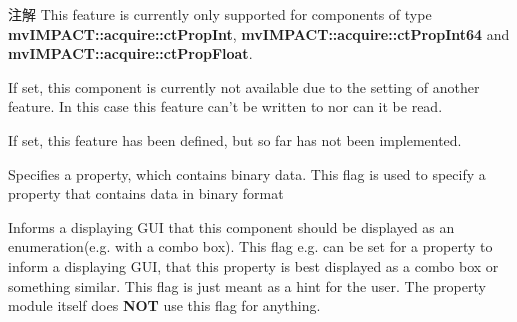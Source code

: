 \begin{Desc}
\begin{description}
\begin{DoxyNote}{注解}
This feature is currently only supported for components of type {\bfseries mv\+I\+M\+P\+A\+C\+T\+::acquire\+::ct\+Prop\+Int}, {\bfseries mv\+I\+M\+P\+A\+C\+T\+::acquire\+::ct\+Prop\+Int64} and {\bfseries mv\+I\+M\+P\+A\+C\+T\+::acquire\+::ct\+Prop\+Float}. 
\end{DoxyNote}
\item[{\em 
\hypertarget{group___common_interface_gga4ef1be7cf1ca9dd256fd3060dd0787bbab76335465359e37c3b047a7d8bd324b5}{cf\+Not\+Available}\label{group___common_interface_gga4ef1be7cf1ca9dd256fd3060dd0787bbab76335465359e37c3b047a7d8bd324b5}
}]If set, this component is currently not available due to the setting of another feature. In this case this feature can't be written to nor can it be read. \item[{\em 
\hypertarget{group___common_interface_gga4ef1be7cf1ca9dd256fd3060dd0787bbab0572d6d34d9cfc2789ea3d510188313}{cf\+Not\+Implemented}\label{group___common_interface_gga4ef1be7cf1ca9dd256fd3060dd0787bbab0572d6d34d9cfc2789ea3d510188313}
}]If set, this feature has been defined, but so far has not been implemented. \item[{\em 
\hypertarget{group___common_interface_gga4ef1be7cf1ca9dd256fd3060dd0787bba7826a2a769e3f89c861d24649d24e024}{cf\+Contains\+Binary\+Data}\label{group___common_interface_gga4ef1be7cf1ca9dd256fd3060dd0787bba7826a2a769e3f89c861d24649d24e024}
}]Specifies a property, which contains binary data. This flag is used to specify a property that contains data in binary format \item[{\em 
\hypertarget{group___common_interface_gga4ef1be7cf1ca9dd256fd3060dd0787bbae6665bb039ae7697b5ea4d36c776d81e}{cf\+Should\+Be\+Displayed\+As\+Enumeration}\label{group___common_interface_gga4ef1be7cf1ca9dd256fd3060dd0787bbae6665bb039ae7697b5ea4d36c776d81e}
}]Informs a displaying G\+U\+I that this component should be displayed as an enumeration(e.\+g. with a combo box). This flag e.\+g. can be set for a property to inform a displaying G\+U\+I, that this property is best displayed as a combo box or something similar. This flag is just meant as a hint for the user. The property module itself does {\bfseries N\+O\+T} use this flag for anything.


\end{description}
\end{Desc}
